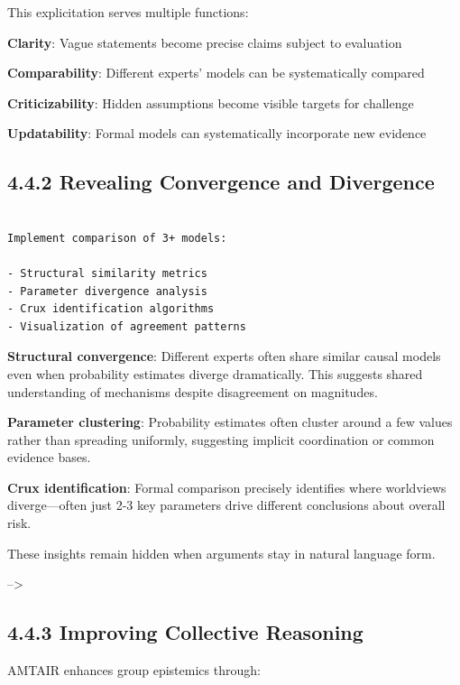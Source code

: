 \documentclass[
  11pt,
  letterpaper,
]{book}
\begin{document}
This explicitation serves multiple functions:

\textbf{Clarity}: Vague statements become precise claims subject to
evaluation

\textbf{Comparability}: Different experts' models can be systematically
compared

\textbf{Criticizability}: Hidden assumptions become visible targets for
challenge

\textbf{Updatability}: Formal models can systematically incorporate new
evidence

\subsection*{4.4.2 Revealing Convergence and
Divergence}\label{sec-convergence-divergence}

\begin{verbatim}

Implement comparison of 3+ models:

- Structural similarity metrics
- Parameter divergence analysis
- Crux identification algorithms
- Visualization of agreement patterns
\end{verbatim}

\textbf{Structural convergence}: Different experts often share similar
causal models even when probability estimates diverge dramatically. This
suggests shared understanding of mechanisms despite disagreement on
magnitudes.

\textbf{Parameter clustering}: Probability estimates often cluster
around a few values rather than spreading uniformly, suggesting implicit
coordination or common evidence bases.

\textbf{Crux identification}: Formal comparison precisely identifies
where worldviews diverge---often just 2-3 key parameters drive different
conclusions about overall risk.

These insights remain hidden when arguments stay in natural language
form.

--\textgreater{}

\subsection*{4.4.3 Improving Collective
Reasoning}\label{sec-collective-reasoning}

AMTAIR enhances group epistemics through:
\end{document}

